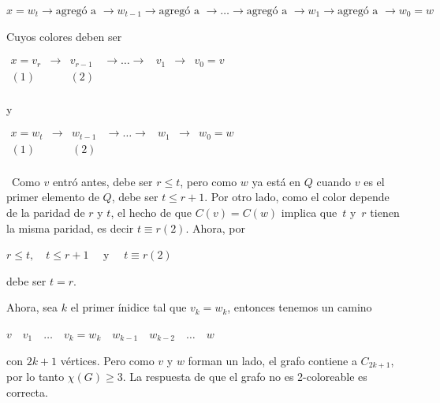 \documentclass[10pt,a4paper]{article}
\begin{document}
\begin{center}
$x = w_t \rightarrow\text{agregó a } \rightarrow w_{t-1} \rightarrow\text{agregó a } \rightarrow \dots \rightarrow\text{agregó a } \rightarrow w_1 \rightarrow\text{agregó a } \rightarrow w_0 = w$
\end{center}

Cuyos colores deben ser

\begin{center}
$\begin{array}{ccccccc} x = v_r &\rightarrow &v_{r-1} &\rightarrow \dots \rightarrow &v_1 &\rightarrow &v_0 = v\\ (1) & &(2) & & & &\\ \end{array}$
\end{center}

\begin{center}
y
\end{center}

\begin{center}
$\begin{array}{ccccccc} x = w_t &\rightarrow &w_{t-1} &\rightarrow \dots \rightarrow &w_1 &\rightarrow &w_0 = w\\ (1) & &(2) & & & &\\ \end{array}$
\end{center}

 Como $v$ entró antes, debe ser $r\leq t$, pero como $w$ ya está en $Q$ cuando $v$ es el primer elemento de $Q$, debe ser $t \leq r + 1$. Por otro lado, como el color depende de la paridad de $r$ y $t$, el hecho de que $C(v) = C(w)$ implica que $t$ y $r$ tienen la misma paridad, es decir $t\equiv r( 2)$. Ahora, por

\begin{center}
$r \leq t,\quad t\leq r+1 \quad\text{ y }\quad t\equiv r(2)$
\end{center}

debe ser $t=r$.

Ahora, sea $k$ el primer ínidice tal que $v_k=w_k$, entonces tenemos un camino

\begin{center}
$v\quad v_1\quad\dots\quad v_k = w_k \quad w_{k-1}\quad w_{k-2} \quad \dots \quad w $
\end{center}

con $2 k + 1$ vértices. Pero como $v$ y $w$ forman un lado, el grafo contiene a $C_{2k+1}$, por lo tanto $\chi(G) \geq 3$. La respuesta de que el grafo no es 2-coloreable es correcta.
\end{document}

